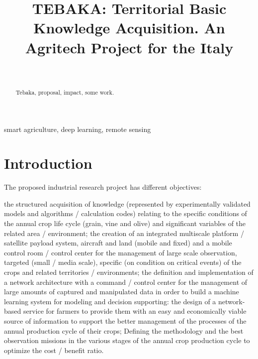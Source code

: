\documentclass[conference]{IEEEtran}
\begin{document}

\title{TEBAKA: Territorial Basic Knowledge Acquisition. An Agritech Project for the Italy}
\author{\\
}

\maketitle

\begin{abstract}
Tebaka, proposal, impact, some work.
\end{abstract}

\begin{IEEEkeywords}
smart agriculture, deep learning, remote sensing
\end{IEEEkeywords}


\section{Introduction}

The proposed industrial research project has different objectives:

the structured acquisition of knowledge (represented by experimentally validated models and algorithms / calculation codes) relating to the specific conditions of the annual crop life cycle (grain, vine and olive) and significant variables of the related area / environment;
the creation of an integrated multiscale platform / satellite payload system, aircraft and land (mobile and fixed) and a mobile control room / control center for the management of large scale observation, targeted (small / media scale), specific (on condition on critical events) of the crops and related territories / environments;
the definition and implementation of a network architecture with a command / control center for the management of large amounts of captured and manipulated data in order to build a machine learning system for modeling and decision supporting:
the design of a network-based service for farmers to provide them with an easy and economically viable source of information to support the better management of the processes of the annual production cycle of their crops;
Defining the methodology and the best observation missions in the various stages of the annual crop production cycle to optimize the cost / benefit ratio.
\end{document}
